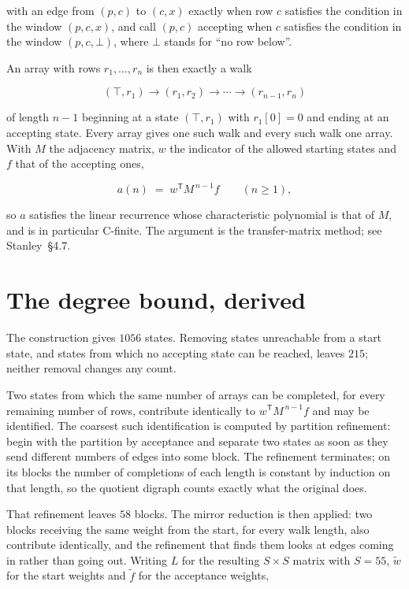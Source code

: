 \documentclass[11pt]{article}
\theoremstyle{definition}
\begin{document}
with an edge from $(p,c)$ to $(c,x)$ exactly when row $c$ satisfies the condition in the window $(p,c,x)$, and call $(p,c)$ accepting when $c$ satisfies the condition in the window $(p,c,\bot)$, where $\bot$ stands for ``no row below''.

An array with rows $r_1,\dots,r_n$ is then exactly a walk

\[(\top,r_1) \to (r_1,r_2) \to \cdots \to (r_{n-1},r_n)\]

of length $n-1$ beginning at a state $(\top,r_1)$ with $r_1[0]=0$ and ending at an accepting state. Every array gives one such walk and every such walk one array. With $M$ the adjacency matrix, $w$ the indicator of the allowed starting states and $f$ that of the accepting ones,

\[a(n) \;=\; w^{\mathsf T} M^{\,n-1} f \qquad (n \ge 1),\]

so $a$ satisfies the linear recurrence whose characteristic polynomial is that of $M$, and is in particular C-finite. The argument is the transfer-matrix method; see Stanley~\S4.7.

\section{The degree bound, derived}

The construction gives $1056$ states. Removing states unreachable from a start state, and states from which no accepting state can be reached, leaves $215$; neither removal changes any count.

Two states from which the same number of arrays can be completed, for every remaining number of rows, contribute identically to $w^{\mathsf T}M^{\,n-1}f$ and may be identified. The coarsest such identification is computed by partition refinement: begin with the partition by acceptance and separate two states as soon as they send different numbers of edges into some block. The refinement terminates; on its blocks the number of completions of each length is constant by induction on that length, so the quotient digraph counts exactly what the original does.

That refinement leaves $58$ blocks. The mirror reduction is then applied: two blocks receiving the same weight from the start, for every walk length, also contribute identically, and the refinement that finds them looks at edges coming in rather than going out. Writing $L$ for the resulting $S \times S$ matrix with $S = 55$, $\tilde w$ for the start weights and $\tilde f$ for the acceptance weights,
\end{document}
